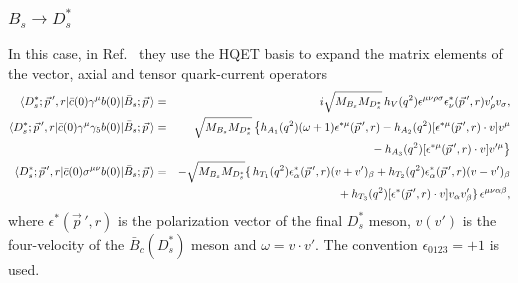 \documentclass[aps,superscriptaddress,showpacs,nofootinbib,11pt]{revtex4-1}
\newcommand{\bea}{\begin{eqnarray}} \newcommand{\eea}{\end{eqnarray}}
\newcommand{\mbs}{M_{B_s}}
\newcommand{\mdss}{M_{D_s^*}}
\begin{document}
\subsubsection{$B_s\to D_s^*$}
In this case, in Ref.~\cite{Harrison:2023dzh} they use the HQET basis to expand the matrix elements of the vector, axial and tensor quark-current operators
\bea
\langle D^*_s;\vec p\,',r|\bar c(0)\gamma^\mu b(0)|\bar B_s;\vec p\,\rangle&=&i\sqrt{\mbs\mdss}\,h_V(q^2)\epsilon^{\mu\nu\rho\sigma}\epsilon^*_{\nu}(\vec p\,',r)v'_\rho v_\sigma,\nonumber\\
\langle D^*_s;\vec p\,',r|\bar c(0)\gamma^\mu \gamma_5 b(0)|\bar B_s;\vec p\,\rangle&=&\sqrt{\mbs\mdss}\,\big\{h_{A_1}(q^2)(\omega+1)\epsilon^{*\mu}(\vec p\,',r)-
h_{A_2}(q^2)[\epsilon^{*\mu}(\vec p\,',r)\cdot v] v^\mu\nonumber\\
&&\hspace{2.15cm} {}-
h_{A_3}(q^2)[\epsilon^{*\mu}(\vec p\,',r)\cdot v] v^{\prime\mu}\big\}\nonumber\\
\langle D^*_s;\vec p\,',r|\bar c(0)\sigma^{\mu\nu} b(0)|\bar B_s;\vec p\,\rangle&=&
-\sqrt{\mbs\mdss}\{\,h_{T_1}(q^2)\epsilon^{*}_\alpha(\vec p\,',r)
(v+v^{\prime})_\beta+h_{T_2}(q^2)\epsilon^{*}_\alpha(\vec p\,',r)
(v-v^{\prime})_\beta\nonumber\\
&&\hspace{2.15cm} {}+h_{T_3}(q^2)[\epsilon^{*}(\vec p\,',r)\cdot v]
v_\alpha v^{\prime}_\beta\}\,\epsilon^{\mu\nu\alpha\beta},
\label{eq:hqetha123vt123}
\eea
where $\epsilon^{*}(\vec p\,',r)$ is the polarization vector of the final $D_s^*$ meson, $v(v')$ is the four-velocity of the $\bar B_c (D^*_s)$ meson and $\omega=v\cdot v'$. The  convention $\epsilon_{0123}=+1$ is used.
\end{document}
